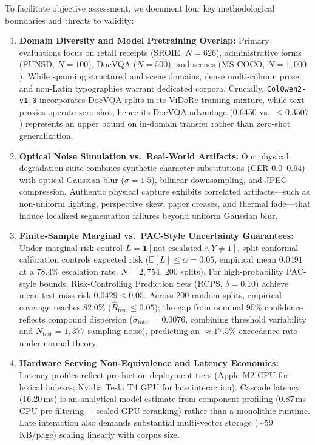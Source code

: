 To facilitate objective assessment, we document four key methodological boundaries and threats to validity:
\begin{enumerate}
    \setlength{\itemsep}{0pt}
    \setlength{\parskip}{0pt}
    \setlength{\parsep}{0pt}
    \setlength{\topsep}{1pt}
    \item \textbf{Domain Diversity and Model Pretraining Overlap:} Primary evaluations focus on retail receipts (SROIE, $N=626$), administrative forms (FUNSD, $N=100$), DocVQA ($N=500$), and scenes (MS-COCO, $N=1{,}000$). While spanning structured and scene domains, dense multi-column prose and non-Latin typographies warrant dedicated corpora. Crucially, \texttt{ColQwen2-v1.0} \cite{faysse2024colqwen2} incorporates DocVQA splits in its ViDoRe training mixture, while text proxies operate zero-shot; hence its DocVQA advantage (0.6450 vs.\ $\le 0.3507$) represents an upper bound on in-domain transfer rather than zero-shot generalization.
    \item \textbf{Optical Noise Simulation vs.\ Real-World Artifacts:} Our physical degradation suite combines synthetic character substitutions (CER $0.0$--$0.64$) with optical Gaussian blur ($\sigma=1.5$), bilinear downsampling, and JPEG compression. Authentic physical capture exhibits correlated artifacts---such as non-uniform lighting, perspective skew, paper creases, and thermal fade---that induce localized segmentation failures beyond uniform Gaussian blur.
    \item \textbf{Finite-Sample Marginal vs.\ PAC-Style Uncertainty Guarantees:} Under marginal risk control $L = \mathbf{1}[\text{not escalated} \land Y \ne 1]$, split conformal calibration controls expected risk ($\mathbb{E}[L] \le \alpha = 0.05$, empirical mean $0.0491$ at a 78.4\% escalation rate, $N=2{,}754$, 200 splits). For high-probability PAC-style bounds, Risk-Controlling Prediction Sets (RCPS, $\delta=0.10$) achieve mean test miss risk $0.0429 \le 0.05$. Across 200 random splits, empirical coverage reaches 82.0\% ($\hat{R}_{\text{test}} \le 0.05$); the gap from nominal 90\% confidence reflects compound dispersion ($\sigma_{\text{total}} = 0.0076$, combining threshold variability and $N_{\text{test}}=1{,}377$ sampling noise), predicting an $\approx 17.5\%$ exceedance rate under normal theory.
    \item \textbf{Hardware Serving Non-Equivalence and Latency Economics:} Latency profiles reflect production deployment tiers (Apple M2 CPU for lexical indexes; Nvidia Tesla T4 GPU for late interaction). Cascade latency (16.20\,ms) is an analytical model estimate from component profiling (0.87\,ms CPU pre-filtering + scaled GPU reranking) rather than a monolithic runtime. Late interaction also demands substantial multi-vector storage ($\sim 59$\,KB/page) scaling linearly with corpus size.
\end{enumerate}

